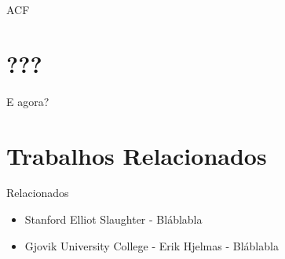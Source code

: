 \documentclass[tg]{mdtufsm}
\begin{document}
ACF

\section{???}

E agora?

\section{Trabalhos Relacionados}

Relacionados

\begin{itemize}
	\item Stanford Elliot Slaughter \cite{nesi} - Bláblabla
	
	\item Gjovik University College - Erik Hjelmas \cite{nesc} - Bláblabla
\end{itemize}
\end{document}

